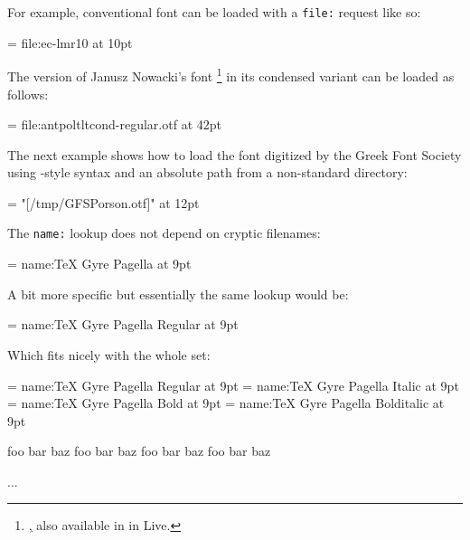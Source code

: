 \endsubsection



For example, conventional  font can be loaded with a \verb|file:|
request like so:

\beginlisting
  \font \lmromanten = {file:ec-lmr10} at 10pt
\endlisting

The \OpenType version of Janusz Nowacki’s font \footnote{%
  \hyperlink {http://jmn.pl/antykwa-poltawskiego/}, also available in
  in \TEX Live.
}
in its condensed variant can be loaded as follows:

\beginlisting
  \font \apcregular = file:antpoltltcond-regular.otf at 42pt
\endlisting

The next example shows how to load the  font digitized by
the Greek Font Society using \XETEX-style syntax and an absolute path from a
non-standard directory:

\beginlisting
  \font \gfsporson = "[/tmp/GFSPorson.otf]" at 12pt
\endlisting

\endsubsubsection


The \verb|name:| lookup does not depend on cryptic filenames:

\beginlisting
  \font \pagellaregular = {name:TeX Gyre Pagella} at 9pt
\endlisting

A bit more specific but essentially the same lookup would be:

\beginlisting
  \font \pagellaregular = {name:TeX Gyre Pagella Regular} at 9pt
\endlisting

\noindent
Which fits nicely with the whole set:

\beginlisting
  \font\pagellaregular    = {name:TeX Gyre Pagella Regular}    at 9pt
  \font\pagellaitalic     = {name:TeX Gyre Pagella Italic}     at 9pt
  \font\pagellabold       = {name:TeX Gyre Pagella Bold}       at 9pt
  \font\pagellabolditalic = {name:TeX Gyre Pagella Bolditalic} at 9pt

  {\pagellaregular     foo bar baz\endgraf}
  {\pagellaitalic      foo bar baz\endgraf}
  {\pagellabold        foo bar baz\endgraf}
  {\pagellabolditalic  foo bar baz\endgraf}

  ...
\endlisting

\endsubsubsection



